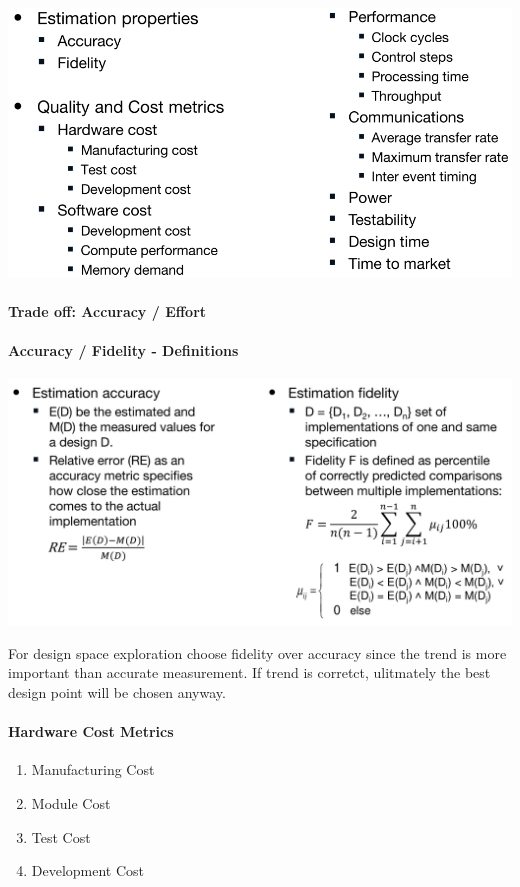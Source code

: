 \documentclass[english]{latex4ei/latex4ei_sheet}
\begin{document}
\begin{center}
  \includegraphics[width=0.8\linewidth]{assets/EstimationMetrics.png}
  \label{fig:estimationmetrics}
\end{center}

\paragraph{Trade off: Accuracy / Effort}


\paragraph{Accuracy / Fidelity - Definitions}
\begin{center}
  \includegraphics[width=\linewidth]{assets/AccuracyFidelityDefinitions.png}
  \label{fig:accuracyfidelitydefinitions}
\end{center}

For design space exploration choose fidelity over accuracy since the trend is more important than accurate measurement. If trend is corretct, ulitmately the best design point will be chosen anyway.

\paragraph{Hardware Cost Metrics}
\begin{enumerate}
	\item Manufacturing Cost
	\item Module Cost
	\item Test Cost
	\item Development Cost
\end{enumerate}
\end{document}
